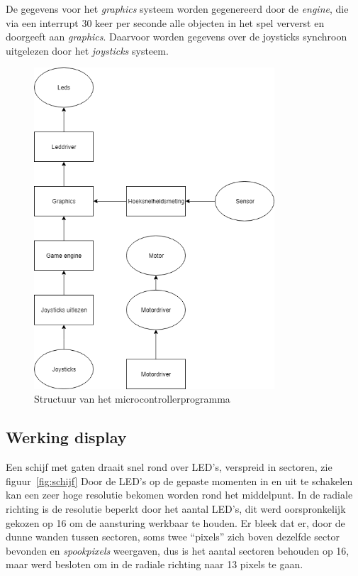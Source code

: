 \documentclass[12pt]{ugentreport}
\begin{document}
De gegevens voor het \emph{graphics} systeem worden gegenereerd door de
\emph{engine}, die via een interrupt 30 keer per seconde alle objecten in het
spel ververst en doorgeeft aan \emph{graphics}. Daarvoor worden gegevens over de
joysticks synchroon uitgelezen door het \emph{joysticks} systeem.

\begin{figure}
  \centering
  \includegraphics[width=0.8\textwidth]{img/structuur.png}
  \caption{Structuur van het microcontrollerprogramma}
  \label{fig:structuur}
\end{figure}


\subsection{Werking display}
Een schijf met gaten draait snel rond over LED's, verspreid in sectoren, zie figuur~\ref{fig:schijf}
Door de LED's op de gepaste momenten in en uit te schakelen
kan een zeer hoge resolutie bekomen worden rond het middelpunt.
In de radiale richting is de resolutie beperkt door het aantal LED's,
dit werd oorspronkelijk gekozen op 16 om de aansturing werkbaar te houden.
Er bleek dat er, door de dunne wanden tussen sectoren, soms twee ``pixels''
zich boven dezelfde sector bevonden en \emph{spookpixels} weergaven,
dus is het aantal sectoren behouden op 16,
maar werd besloten om in de radiale richting naar 13 pixels te gaan.
\end{document}
